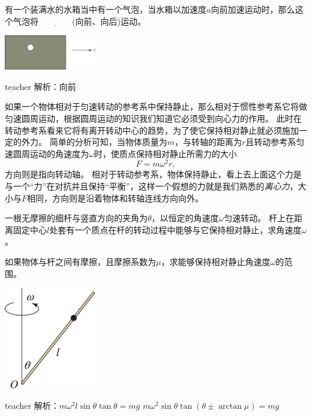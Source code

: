 \begin{example}
	有一个装满水的水箱当中有一个气泡，当水箱以加速度$a$向前加速运动时，那么这个气泡将$\underline{\qquad\qquad}$(向前、向后)运动。
		\begin{flushright}
			\includegraphics[width = 0.3\textwidth]{images/newton-17.pdf} 
		\end{flushright}
	\begin{taggedblock}{teacher}
		\noindent
		解析：向前
	\end{taggedblock}
\end{example}


如果一个物体相对于匀速转动的参考系中保持静止，那么相对于惯性参考系它将做匀速圆周运动，根据圆周运动的知识我们知道它必须受到向心力的作用。
此时在转动参考系看来它将有离开转动中心的趋势，为了使它保持相对静止就必须施加一定的外力。
简单的分析可知，当物体质量为$m$，与转轴的距离为$r$且转动参考系匀速圆周运动的角速度为$\omega$时，使质点保持相对静止所需力的大小
\begin{equation}
F = m\omega^2r,
\end{equation}
方向则是指向转动轴。
相对于转动参考系，物体保持静止，看上去上面这个力是与一个“力”在对抗并且保持“平衡”，这样一个假想的力就是我们熟悉的\emph{离心力}，大小与$F$相同，方向则是沿着物体和转轴连线方向向外。

\begin{example}
	一根无摩擦的细杆与竖直方向的夹角为$\theta$，以恒定的角速度$\omega$匀速转动。
	杆上在距离固定中心$l$处套有一个质点在杆的转动过程中能够与它保持相对静止，求角速度$\omega$。
	
	如果物体与杆之间有摩擦，且摩擦系数为$\mu$，求能够保持相对静止角速度$\omega$的范围。
		\begin{flushright}
			\includegraphics[width = 0.3\textwidth]{images/newton-18.pdf} 
		\end{flushright}
	\begin{taggedblock}{teacher}
		\noindent
		解析：$m\omega^2l\sin\theta\tan\theta=mg$
		\newline
		$m\omega^2\sin\theta\tan(\theta\pm\arctan\mu)=mg$
		\end{taggedblock}
		\end{example}
		
